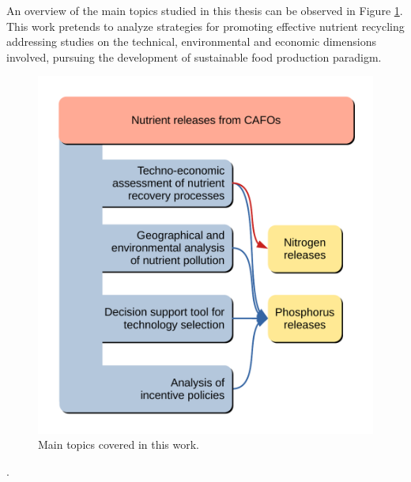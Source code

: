 \begin{refsection}[referencesCh1]
An overview of the main topics studied in this thesis can be observed in Figure \ref{fig:Ch1WorkThesis}. This work pretends to analyze strategies for promoting effective nutrient recycling addressing studies on the technical, environmental and economic dimensions involved, pursuing the development of sustainable food production paradigm.

\begin{figure}[h]
	\centering
	\includegraphics[width=0.7\linewidth, trim={1cm 1cm 1cm 1cm},clip]{gfx/Chapter1/IntroFig2.pdf} 
	\caption{Main topics covered in this work.}
	\label{fig:Ch1WorkThesis}
\end{figure}. 



\end{refsection}
